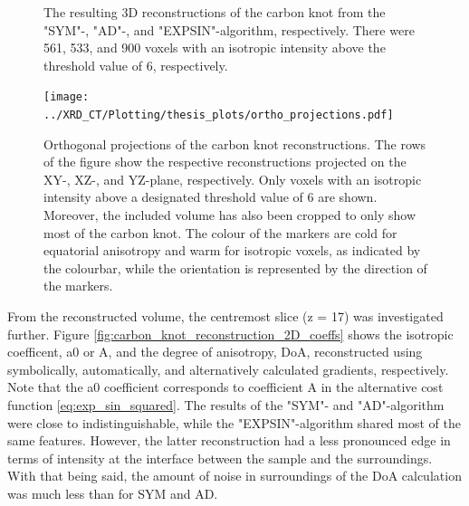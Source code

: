 \begin{figure}[h!]
    

    \caption[3D Reconstructions of Carbon Knot]{ The resulting 3D reconstructions of the carbon knot from the "SYM"-, "AD"-, and "EXPSIN"-algorithm, respectively.
        There were 561, 533, and 900 voxels with an isotropic intensity above the threshold value of 6, respectively.
    }
    \label{fig:carbon_knot_reconstruction_3D}
\end{figure}

\clearpage

\begin{figure}

    \centering

    \texttt{[image: ../XRD\_CT/Plotting/thesis\_plots/ortho\_projections.pdf]}
    
    \caption[Orthogonal Projections of Carbon Knot]{ Orthogonal projections of the carbon knot reconstructions.
        The rows of the figure show the respective reconstructions projected on the XY-, XZ-, and YZ-plane, respectively.
        Only voxels with an isotropic intensity above a designated threshold value of 6 are shown.
        Moreover, the included volume has also been cropped to only show most of the carbon knot.
        The colour of the markers are cold for equatorial anisotropy and warm for isotropic voxels, as indicated by the colourbar, while the orientation is represented by the direction of the markers.
    }
    \label{fig:carbon_knot_ortho}

\end{figure}

\clearpage

From the reconstructed volume, the centremost slice (z = 17) was investigated further.
Figure \ref{fig:carbon_knot_reconstruction_2D_coeffs} shows the isotropic coefficent, a0 or A, and the degree of anisotropy, DoA, reconstructed using symbolically, automatically, and alternatively calculated gradients, respectively.
Note that the a0 coefficient corresponds to coefficient A in the alternative cost function \eqref{eq:exp_sin_squared}.
The results of the "SYM"- and "AD"-algorithm were close to indistinguishable,
while the "EXPSIN"-algorithm shared most of the same features.
However, the latter reconstruction had a less pronounced edge in terms of intensity at the interface between the sample and the surroundings.
With that being said, the amount of noise in surroundings of the DoA calculation was much less than for SYM and AD.

